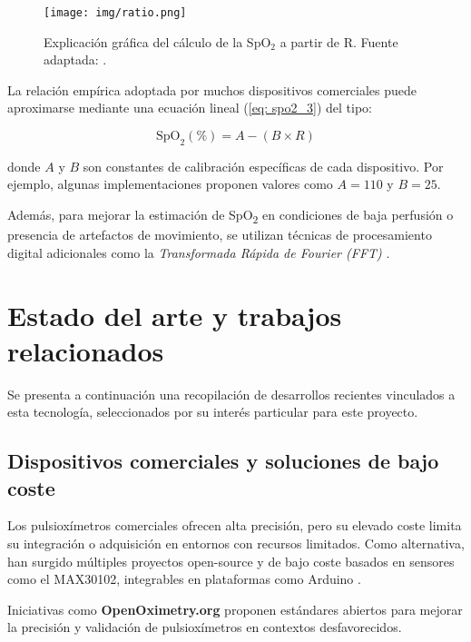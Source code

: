 \begin{figure}[H]
    \centering
    \texttt{[image: img/ratio.png]}
    \caption{Explicación gráfica del cálculo de la SpO$_2$ a partir de R. Fuente adaptada: \cite{deshmane2009false}.}
    \label{fig:ratio}
\end{figure}

La relación empírica adoptada por muchos dispositivos comerciales puede aproximarse mediante una ecuación lineal (\ref{eq: spo2_3}) del tipo:

\begin{equation}
    \text{SpO}_2 (\%) = A - (B \times R)
    \label{eq: spo2_3}
\end{equation}

donde \( A \) y \( B \) son constantes de calibración específicas de cada dispositivo. Por ejemplo, algunas implementaciones proponen valores como \( A = 110 \) y \( B = 25 \).

Además, para mejorar la estimación de SpO\textsubscript{2} en condiciones de baja perfusión o presencia de artefactos de movimiento, se utilizan técnicas de procesamiento digital adicionales como la \textit{Transformada Rápida de Fourier (FFT)} \cite{jimenez2019pulsioximetro}.


\section{Estado del arte y trabajos relacionados}

Se presenta a continuación una recopilación de desarrollos recientes vinculados a esta tecnología, seleccionados por su interés particular para este proyecto.

\subsection{Dispositivos comerciales y soluciones de bajo coste}

Los pulsioxímetros comerciales ofrecen alta precisión, pero su elevado coste limita su integración o adquisición en entornos con recursos limitados. Como alternativa, han surgido múltiples proyectos open-source y de bajo coste basados en sensores como el MAX30102, integrables en plataformas como Arduino \cite{llamas_pulsimetro_max30102}. 

Iniciativas como \textbf{OpenOximetry.org} \cite{openoximetry2025} proponen estándares abiertos para mejorar la precisión y validación de pulsioxímetros en contextos desfavorecidos.

